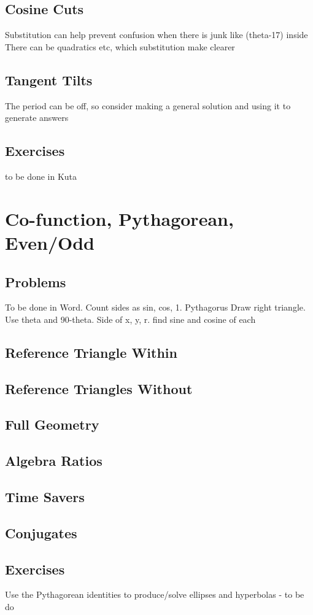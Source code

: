 \subsection{Cosine Cuts}
Substitution can help prevent confusion when there is junk like (theta-17) inside
There can be quadratics etc, which substitution make clearer
\subsection{Tangent Tilts}
The period can be off, so consider making a general solution and using it to generate answers
\newpage
\subsection{Exercises}
to be done in Kuta


\newpage
\section{Co-function, Pythagorean, Even/Odd}
\subsection{Problems}
To be done in Word.
Count sides as sin, cos, 1.  Pythagorus
Draw right triangle.  Use theta and 90-theta.  Side of x, y, r.  find sine and cosine of each
\newpage
\subsection{Reference Triangle Within}
\subsection{Reference Triangles Without}
\subsection{Full Geometry}
\subsection{Algebra Ratios}
\subsection{Time Savers}
\subsection{Conjugates}
\newpage
\subsection{Exercises}
Use the Pythagorean identities to produce/solve ellipses and hyperbolas - to be do


